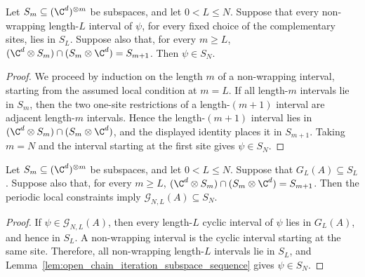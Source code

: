 \begin{lemma}%
    \label{lem:open_chain_iteration_subspace_sequence}
    \leanok
    Let $S_m\subseteq(\C^d)^{\otimes m}$ be subspaces, and let $0<L\le N$.
    Suppose that every non-wrapping length-$L$ interval of $\psi$, for every
    fixed choice of the complementary sites, lies in $S_L$. Suppose also that,
    for every $m\ge L$,
    $(\C^d\otimes S_m)\cap (S_m\otimes\C^d) = S_{m+1}$.
    Then $\psi\in S_N$.
\end{lemma}

\begin{proof}
    \leanok
    We proceed by induction on the length $m$ of a non-wrapping interval,
    starting from the assumed local condition at $m=L$. If all length-$m$
    intervals lie in $S_m$, then the two one-site restrictions of a
    length-$(m+1)$ interval are adjacent length-$m$ intervals. Hence the
    length-$(m+1)$ interval lies in
    $(\C^d\otimes S_m)\cap(S_m\otimes\C^d)$, and the displayed identity places
    it in $S_{m+1}$. Taking $m=N$ and the interval starting at the first site
    gives $\psi\in S_N$.
\end{proof}

\begin{lemma}%
    \label{lem:periodic_constraints_propagated_subspace_sequence}
    \leanok
    Let $S_m\subseteq(\C^d)^{\otimes m}$ be subspaces, and let $0<L\le N$.
    Suppose that $G_L(A)\subseteq S_L$. Suppose also that, for every $m\ge L$,
    $(\C^d\otimes S_m)\cap (S_m\otimes\C^d) = S_{m+1}$.
    Then the periodic local constraints imply
    $\mathcal G_{N,L}(A)\subseteq S_N$.
\end{lemma}

\begin{proof}
    \leanok
    If $\psi\in\mathcal G_{N,L}(A)$, then every length-$L$ cyclic interval of
    $\psi$ lies in $G_L(A)$, and hence in $S_L$. A non-wrapping interval is the
    cyclic interval starting at the same site. Therefore, all non-wrapping
    length-$L$ intervals lie in $S_L$, and
    Lemma~\ref{lem:open_chain_iteration_subspace_sequence} gives
    $\psi\in S_N$.
\end{proof}

